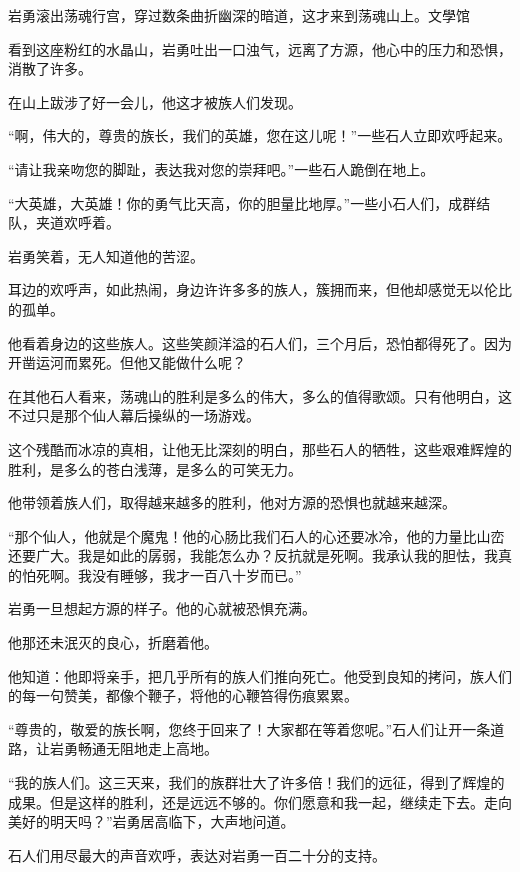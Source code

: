 
\begin{this_body}

岩勇滚出荡魂行宫，穿过数条曲折幽深的暗道，这才来到荡魂山上。文學馆

看到这座粉红的水晶山，岩勇吐出一口浊气，远离了方源，他心中的压力和恐惧，消散了许多。

在山上跋涉了好一会儿，他这才被族人们发现。

“啊，伟大的，尊贵的族长，我们的英雄，您在这儿呢！”一些石人立即欢呼起来。

“请让我亲吻您的脚趾，表达我对您的崇拜吧。”一些石人跪倒在地上。

“大英雄，大英雄！你的勇气比天高，你的胆量比地厚。”一些小石人们，成群结队，夹道欢呼着。

岩勇笑着，无人知道他的苦涩。

耳边的欢呼声，如此热闹，身边许许多多的族人，簇拥而来，但他却感觉无以伦比的孤单。

他看着身边的这些族人。这些笑颜洋溢的石人们，三个月后，恐怕都得死了。因为开凿运河而累死。但他又能做什么呢？

在其他石人看来，荡魂山的胜利是多么的伟大，多么的值得歌颂。只有他明白，这不过只是那个仙人幕后操纵的一场游戏。

这个残酷而冰凉的真相，让他无比深刻的明白，那些石人的牺牲，这些艰难辉煌的胜利，是多么的苍白浅薄，是多么的可笑无力。

他带领着族人们，取得越来越多的胜利，他对方源的恐惧也就越来越深。

“那个仙人，他就是个魔鬼！他的心肠比我们石人的心还要冰冷，他的力量比山峦还要广大。我是如此的孱弱，我能怎么办？反抗就是死啊。我承认我的胆怯，我真的怕死啊。我没有睡够，我才一百八十岁而已。”

岩勇一旦想起方源的样子。他的心就被恐惧充满。

他那还未泯灭的良心，折磨着他。

他知道：他即将亲手，把几乎所有的族人们推向死亡。他受到良知的拷问，族人们的每一句赞美，都像个鞭子，将他的心鞭笞得伤痕累累。

“尊贵的，敬爱的族长啊，您终于回来了！大家都在等着您呢。”石人们让开一条道路，让岩勇畅通无阻地走上高地。

“我的族人们。这三天来，我们的族群壮大了许多倍！我们的远征，得到了辉煌的成果。但是这样的胜利，还是远远不够的。你们愿意和我一起，继续走下去。走向美好的明天吗？”岩勇居高临下，大声地问道。

石人们用尽最大的声音欢呼，表达对岩勇一百二十分的支持。


\end{this_body}

